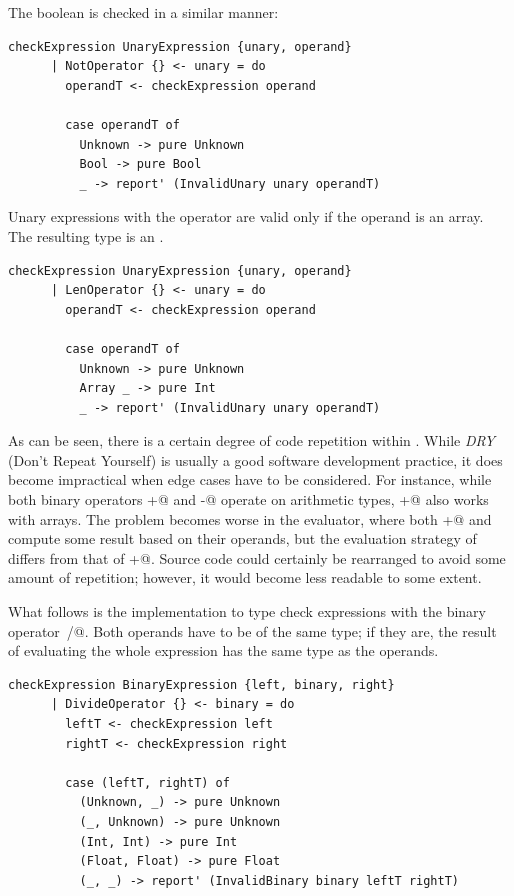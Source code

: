 \documentclass[UdineBachThesis,american,11pt]{PhdThesis}
\begin{document}
  The boolean \lstinline@not@ is checked in a similar manner:

  \begin{lstlisting}[gobble=4,basicstyle=\ttfamily\small]
    checkExpression UnaryExpression {unary, operand}
      | NotOperator {} <- unary = do
        operandT <- checkExpression operand

        case operandT of
          Unknown -> pure Unknown
          Bool -> pure Bool
          _ -> report' (InvalidUnary unary operandT)
  \end{lstlisting}

  Unary expressions with the operator \lstinline@len@ are valid only if the
  operand is an array. The resulting type is an \lstinline@Int@.

  \begin{lstlisting}[gobble=4,basicstyle=\ttfamily\small]
    checkExpression UnaryExpression {unary, operand}
      | LenOperator {} <- unary = do
        operandT <- checkExpression operand

        case operandT of
          Unknown -> pure Unknown
          Array _ -> pure Int
          _ -> report' (InvalidUnary unary operandT)
  \end{lstlisting}

  As can be seen, there is a certain degree of code repetition within
  \lstinline@checkExpression@. While \emph{DRY} (Don't Repeat Yourself) is
  usually a good software development practice, it does become impractical when
  edge cases have to be considered. For instance, while both binary operators
  \lstinline@+@ and \lstinline@-@ operate on arithmetic types, \lstinline@+@
  also works with arrays. The problem becomes worse in the evaluator, where both
  \lstinline@+@ and \lstinline@and@ compute some result based on their operands,
  but the evaluation strategy of \lstinline@and@ differs from that of
  \lstinline@+@. Source code could certainly be rearranged to avoid some amount
  of repetition; however, it would become less readable to some extent.

  What follows is the implementation to type check expressions with the binary
  operator~\lstinline@/@. Both operands have to be of the same type; if they
  are, the result of evaluating the whole expression has the same type as the
  operands.

  \begin{lstlisting}[gobble=4,basicstyle=\ttfamily\small]
    checkExpression BinaryExpression {left, binary, right}
      | DivideOperator {} <- binary = do
        leftT <- checkExpression left
        rightT <- checkExpression right

        case (leftT, rightT) of
          (Unknown, _) -> pure Unknown
          (_, Unknown) -> pure Unknown
          (Int, Int) -> pure Int
          (Float, Float) -> pure Float
          (_, _) -> report' (InvalidBinary binary leftT rightT)
  \end{lstlisting}
\end{document}
